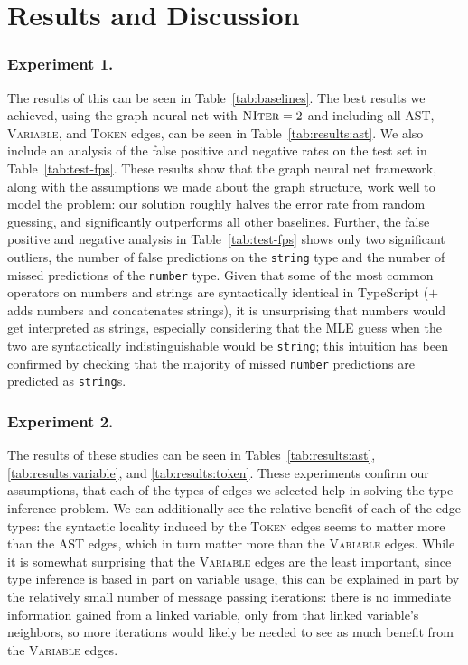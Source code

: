 \section{Results and Discussion}
\label{sec:results}
\subsubsection{Experiment 1.}
The results of this can be seen in Table~\ref{tab:baselines}.
The best results we achieved, using the graph neural net with $\textsc{NIter}=2$ and including all AST, \textsc{Variable}, and \textsc{Token} edges, can be seen in Table~\ref{tab:results:ast}.
We also include an analysis of the false positive and negative rates on the test set in Table~\ref{tab:test-fps}.
These results show that the graph neural net framework, along with the assumptions we made about the graph structure, work well to model the problem: our solution roughly halves the error rate from random guessing, and significantly outperforms all other baselines.
Further, the false positive and negative analysis in Table~\ref{tab:test-fps} shows only two significant outliers, the number of false predictions on the \texttt{string} type and the number of missed predictions of the \texttt{number} type.
Given that some of the most common operators on numbers and strings are syntactically identical in TypeScript ($+$ adds numbers and concatenates strings), it is unsurprising that numbers would get interpreted as strings, especially considering that the MLE guess when the two are syntactically indistinguishable would be \texttt{string}; this intuition has been confirmed by checking that the majority of missed \texttt{number} predictions are predicted as \texttt{string}s.

\subsubsection{Experiment 2.} The results of these studies can be seen in Tables~\ref{tab:results:ast}, \ref{tab:results:variable}, and \ref{tab:results:token}.
These experiments confirm our assumptions, that each of the types of edges we selected help in solving the type inference problem.
We can additionally see the relative benefit of each of the edge types: the syntactic locality induced by the \textsc{Token} edges seems to matter more than the AST edges, which in turn matter more than the \textsc{Variable} edges.
While it is somewhat surprising that the \textsc{Variable} edges are the least important, since type inference is based in part on variable usage, this can be explained in part by the relatively small number of message passing iterations: there is no immediate information gained from a linked variable, only from that linked variable's neighbors, so more iterations would likely be needed to see as much benefit from the \textsc{Variable} edges.

